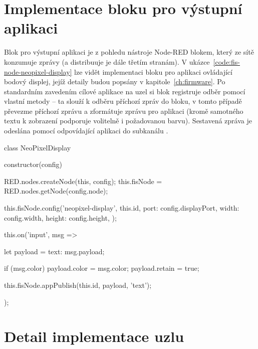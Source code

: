 \section{Implementace bloku pro výstupní aplikaci}\label{sec:implementace-bloku-pro-vystupni-aplikace}
Blok pro výstupní aplikaci je z pohledu nástroje Node-RED blokem, který ze sítě konzumuje zprávy (a distribuuje je
dále třetím stranám).
V ukázce~\ref{code:fis-node-neopixel-display} lze vidět implementaci bloku pro aplikaci ovládající bodový displej,
jejíž detaily budou popsány v kapitole~\ref{ch:firmware}.
Po standardním zavedením cílové aplikace na uzel si blok registruje odběr pomocí vlastní metody  -- ta slouží
k odběru příchozí zpráv do bloku, v tomto případě převezme příchozí zprávu a zformátuje zprávu pro aplikaci
(kromě samotného textu k zobrazení podporuje volitelně i požadovanou barvu).
Sestavená zpráva je odeslána pomocí  odpovídající aplikaci do subkanálu .

\begin{code}[
    language=Javascript,
    label=code:fis-node-neopixel-display,
    caption={Implementace bloku pro aplikaci ovládající bodový displej -- kromě samotné konfigurace na cílovém uzlu
    si uzel zaregistruje funkci pro odběr události typu \ic{\'input\'}.
    Událost tohoto typu notifikuje blok o příchozí zprávě, které je v tomto případě odeslána do aplikace k zobrazení
    na displeji.}
]
class NeoPixelDisplay {
    constructor(config) {
        RED.nodes.createNode(this, config);
        this.fisNode = RED.nodes.getNode(config.node);

        this.fisNode.config('neopixel-display', this.id, {
            port: config.displayPort,
            width: config.width,
            height: config.height,
        });

        this.on('input', msg => {
            let payload = {text: msg.payload};

            if (msg.color)
                payload.color = msg.color;
            payload.retain = true;

            this.fisNode.appPublish(this.id, payload, 'text');
        });
    }
}
\end{code}

\section{Detail implementace uzlu}
